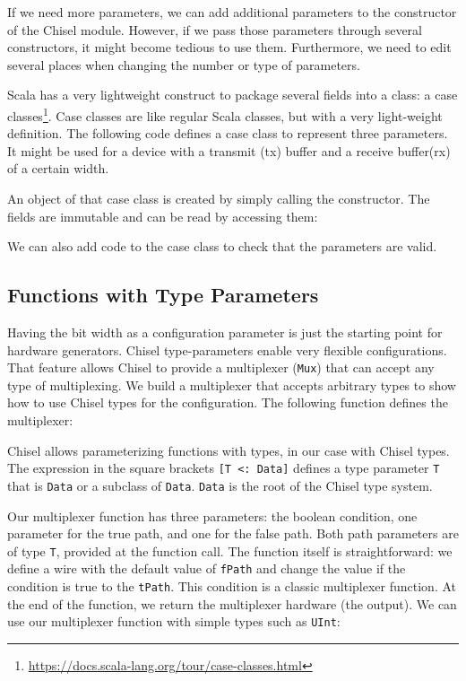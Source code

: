 \documentclass[%
    10pt,
    headinclude, footinclude=false,
    openright, %
    notitlepage,
    cleardoublepage=empty,
    headsepline,
    numbers=noenddot,
    bibliography=totoc, index=totoc,
    ]{scrbook}
\newcommand{\code}[1]{{\lstinline[basicstyle=\small\ttfamily]{#1}}}
\newcommand{\myref}[2]{\href{#1}{#2}}
\renewcommand{\myref}[2]{{#2}{\footnote{\url{#1}}}}
\begin{document}
If we need more parameters, we can add additional parameters to the constructor
of the Chisel module. However, if we pass those parameters through several constructors,
it might become tedious to use them. Furthermore, we need to edit several places when changing the number or type of
parameters.

Scala has a very lightweight construct to package several fields into a class:
a \myref{https://docs.scala-lang.org/tour/case-classes.html}{case classes}.
Case classes are like regular Scala classes, but with a very light-weight definition.
The following code defines a case class to represent three parameters. It might be used for
a device with a transmit (tx) buffer and a receive buffer(rx) of a certain width.


\noindent An object of that case class is created by simply calling the constructor.
The fields are immutable and can be read by accessing them:


\noindent We can also add code to the case class to check that the parameters
are valid.


\subsection{Functions with Type Parameters}

Having the bit width as a configuration parameter is just the starting point for
hardware generators. Chisel type-parameters enable very flexible configurations.
That feature allows Chisel to provide a multiplexer (\code{Mux}) that
can accept any type of multiplexing.
We build a multiplexer that accepts arbitrary types to show how to use Chisel
types for the configuration. The following function defines the multiplexer:


Chisel allows parameterizing functions with types, in our case with Chisel
types. The expression in the square brackets \code{[T <: Data]} defines
a type parameter \code{T} that is \code{Data} or a subclass of \code{Data}.
\code{Data} is the root of the Chisel type system.

Our multiplexer function has three parameters: the boolean condition,
one parameter for the true path, and one for the false path.
Both path parameters are of type \code{T}, 
provided at the function call. The function itself is straightforward:
we define a wire with the default value of \code{fPath} and
change the value if the condition is true to the \code{tPath}.
This condition is a classic multiplexer function.
At the end of the function, we return the multiplexer hardware (the output).
We can use our multiplexer function with simple types such as
\code{UInt}:
\end{document}
